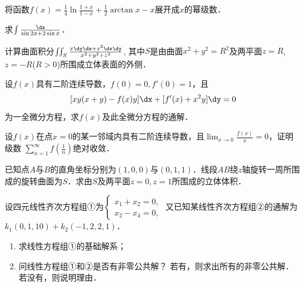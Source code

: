 \documentclass[plain,noanswer,medmath]{../../template/jnuexam}
\begin{document}
\begin{problem}
将函数$f(x) = \frac{1}{4}\ln \frac{1 + x}{1 - x} + \frac{1}{2}\arctan x - x$展开成$x$的幂级数．
\end{problem}


\begin{problem}
求$\int \frac{\dx}{\sin 2x + 2\sin x}$．
\end{problem}



\begin{problem}
计算曲面积分$\iint_S \frac{x\dy\dz + z^2 \dx\dy}{x^2 + y^2 + z^2}$,
其中$S$是由曲面$x^2 + y^2 = R^2$及两平面$z = R$, $z = - R$($R > 0$)所围成立体表面的外侧．
\end{problem}



\begin{problem}
设$f(x)$具有二阶连续导数，$f(0) = 0,f'(0) = 1$，且
$$[xy(x + y) - f(x)y]\dx + [f'(x) + x^2 y]\dy = 0$$
为一全微分方程，求$f(x)$及此全微分方程的通解．
\end{problem}



\begin{problem}
设$f(x)$在点$x = 0$的某一邻域内具有二阶连续导数，且$\lim_{x \to 0} \frac{f(x)}{x} = 0$，证明级数
$\sum_{n = 1}^{\infty}f\left(\frac{1}{n} \right)$绝对收敛．
\end{problem}



\begin{problem}
已知点$A$与$B$的直角坐标分别为$(1,0,0)$与$(0,1,1)$．线段$AB$绕$z$轴旋转一周所围成的旋转曲面为$S$．求由$S$及两平面$z = 0,z = 1$所围成的立体体积．
\end{problem}



\begin{problem}
设四元线性齐次方程组①为$\begin{cases}
  x_1 + x_2 = 0, \\
  x_2 - x_4 = 0,
\end{cases}$ 又已知某线性齐次方程组②的通解为
$k_1(0,1,10) + k_2(- 1,2,2,1)$．
\begin{enumerate}
\item 求线性方程组①的基础解系；
\item 问线性方程组①和②是否有非零公共解？
    若有，则求出所有的非零公共解．若没有，则说明理由．
\end{enumerate}
\end{problem}
\end{document}

